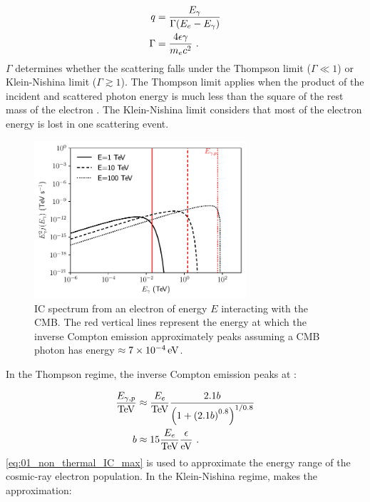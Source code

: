 \begin{subequations}
    \begin{align}
        q&=\frac{E_\gamma}{\Gamma\qty(E_e-E_\gamma)} \\
        \Gamma&=\frac{4\epsilon\gamma}{m_ec^2}\text{ .}
    \end{align}
\end{subequations}
\noindent $\Gamma$ determines whether the scattering falls under the Thompson limit ($\Gamma \ll 1$) or Klein-Nishina limit ($\Gamma \gtrsim 1$). The Thompson limit applies when the product of the incident and scattered photon energy is much less than the square of the rest mass of the electron \citep{RevModPhys.42.237}. The Klein-Nishina limit considers that most of the electron energy is lost in one scattering event.
\begin{figure}
    \centering
    \includegraphics[width=0.7\textwidth]{04_Introduction/Images/non_thermal_emission/IC_spectrum.pdf}
    \caption{IC spectrum from an electron of energy $E$ interacting with the CMB.  The red vertical lines represent the energy at which the inverse Compton emission approximately peaks assuming a CMB photon has energy $\approx 7\times 10^{-4}\,\si{\electronvolt}$.}
    \label{fig:01_IC_flux}
\end{figure}
\newpar
In the Thompson regime, the inverse Compton emission peaks at \citep{2009ARA&A..47..523H}:

\begin{equation}
	\begin{split}
		\frac{E_{\gamma,p}}{\TeV}&\approx \frac{E_e}{\TeV}\frac{2.1b}{\qty(1+\qty(2.1b)^{0.8})^{1/0.8}} \\
		b&\approx 15\frac{E_e}{\TeV}\frac{\epsilon}{\eV}\text{ .}
	\end{split} \label{eq:01_non_thermal_IC_max}
\end{equation}
\noindent \autoref{eq:01_non_thermal_IC_max} is used to approximate the energy range of the cosmic-ray electron population. In the Klein-Nishina regime, \cite{doi:10.1126/science.abg5137} makes the approximation:

